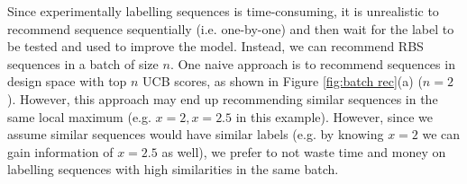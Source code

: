Since experimentally labelling sequences is time-consuming, it is unrealistic to recommend sequence sequentially (i.e. one-by-one) and then wait for the label to be tested and used to improve the model.
Instead, we can recommend RBS sequences in a batch of size $n$. 
One naive approach is to 
recommend sequences in design space with top $n$ UCB scores, as shown in Figure \ref{fig:batch rec}(a) ($n = 2$).
However, this approach may end up recommending similar sequences in the same local maximum (e.g. $x = 2, x =2.5$ in this example). 
However, since we assume similar sequences would have similar labels (e.g. by knowing $x=2$ we can gain information of $x=2.5$ as well), we prefer to not waste time and money on labelling sequences with high similarities in the same batch.

